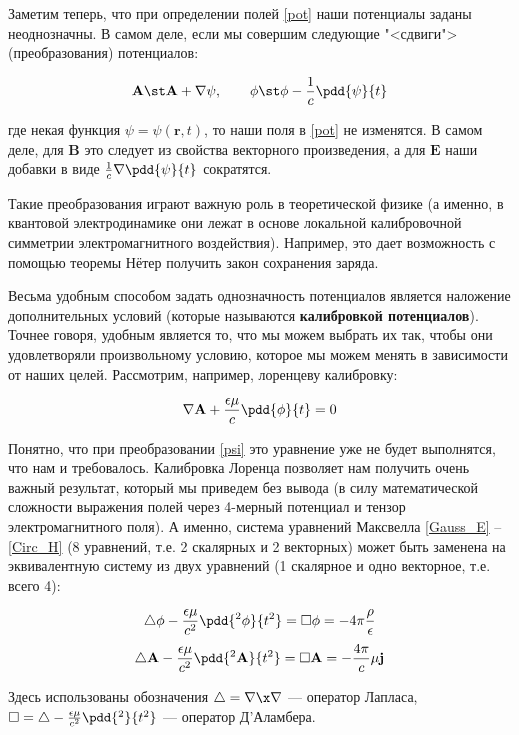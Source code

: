 \documentclass[12pt]{kiarticle}
\begin{document}
Заметим теперь, что при определении полей \eqref{pot} наши потенциалы заданы неоднозначны. В самом деле, если мы совершим следующие "<сдвиги"> (преобразования) потенциалов: 

\begin{equation}\label{psi}
\mathbf{A} \st \mathbf{A} + \nabla \psi, \qquad \phi \st \phi - \dfrac{1}{c} \pdd{\psi}{t}
\end{equation}

где некая функция $ \psi = \psi(\mathbf{r}, t) $, то наши поля в \eqref{pot} не изменятся. В самом деле, для $ \mathbf{B}  $ это следует из свойства векторного произведения, а для $ \mathbf{E} $ наши добавки в виде $ \frac{1}{c} \nabla \pdd{\psi}{t} $ сократятся. 

Такие преобразования играют важную роль в теоретической физике (а именно, в квантовой электродинамике они лежат в основе локальной калибровочной симметрии электромагнитного воздействия). Например, это дает возможность с помощью теоремы Нётер получить закон сохранения заряда. 

Весьма удобным способом задать однозначность потенциалов является наложение дополнительных условий (которые называются \textbf{калибровкой потенциалов}). Точнее говоря, удобным является то, что мы можем выбрать их так, чтобы они удовлетворяли произвольному условию, которое мы можем менять в зависимости от наших целей. Рассмотрим, например, лоренцеву калибровку: 

\begin{equation}\label{}
\nabla \mathbf{A}+ \dfrac{\epsilon \mu}{c} \pdd{\phi}{t} = 0
\end{equation}

Понятно, что при преобразовании \eqref{psi} это уравнение уже не будет выполнятся, что нам и требовалось. Калибровка Лоренца позволяет нам получить очень важный результат, который мы приведем без вывода (в силу математической сложности выражения полей через 4-мерный потенциал и тензор электромагнитного поля). А именно, система уравнений Максвелла \eqref{Gauss_E} -- \eqref{Circ_H} (8 уравнений, т.е. 2 скалярных и 2 векторных) может быть заменена на эквивалентную систему из двух уравнений (1 скалярное и одно векторное, т.е. всего 4):

\begin{equation}\label{}
\triangle \phi - \dfrac{\epsilon \mu }{c^2}\pdd{^2 \phi}{t^2} = \square \phi = -4 \pi \dfrac{\rho}{\epsilon}
\end{equation}
\begin{equation}\label{}
\triangle \mathbf{A}- \dfrac{\epsilon \mu }{c^2}\pdd{^2 \mathbf{A}}{t^2} = \square \mathbf{A}= - \dfrac{4\pi}{c} \mu \mathbf{j}
\end{equation}

Здесь использованы обозначения $ \triangle = \nabla \x \nabla $  --- оператор Лапласа, $ \square = \triangle -  \frac{\epsilon \mu }{c^2}\pdd{^2}{t^2}$ --- оператор Д'Аламбера. 
\end{document}
